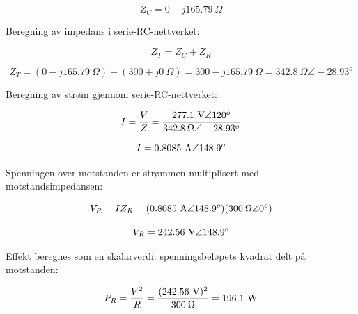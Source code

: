 $$Z_C = 0 - j165.79 \> \Omega$$

\vskip 10pt

Beregning av impedans i serie-RC-nettverket:

$$Z_T = Z_C + Z_R$$

$$Z_T = (0 - j165.79 \> \Omega) + (300 + j0 \> \Omega) = 300 - j165.79 \> \Omega = 342.8 \> \Omega \angle -28.93^o$$

\vskip 10pt

Beregning av strøm gjennom serie-RC-nettverket:

$$I = {V \over Z} = {277.1 \hbox{ V} \angle 120^o \over 342.8 \> \Omega \angle -28.93^o}$$

$$I = 0.8085 \hbox{ A} \angle 148.9^o$$

\vskip 10pt

Spenningen over motstanden er strømmen multiplisert med motstandsimpedansen:

$$V_R = IZ_R = (0.8085 \hbox{ A} \angle 148.9^o)(300 \> \Omega \angle 0^o)$$

$$V_R = 242.56 \hbox{ V} \angle 148.9^o$$

\vskip 10pt

Effekt beregnes som en skalarverdi: spenningsbeløpets kvadrat delt på motstanden:

$$P_R = {V^2 \over R} = {(242.56 \hbox{ V})^2 \over 300 \> \Omega} = 196.1 \hbox{ W}$$


